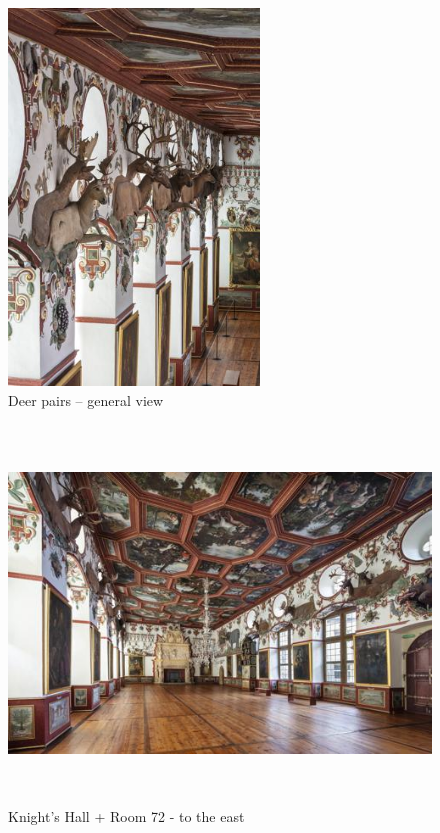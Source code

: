\documentclass[
  a4paper,
  openany]{book}
\begin{document}
\begin{figure}[H]
\centering
\includegraphics[height=10cm]{./images/fmd10005866a.jpg}
\caption{Deer pairs – general view}
\label{fig:{https://previous.bildindex.de/bilder/fmd10005866a.jpg}}
\end{figure}

\clearpage

\begin{figure}[H]
\centering
\includegraphics[height=10cm]{./images/fmd10005859a.jpg}
\caption{Knight's Hall + Room 72 - to the east}
\label{fig:{https://previous.bildindex.de/bilder/fmd10005859a.jpg}}
\end{figure}

\clearpage
\end{document}
